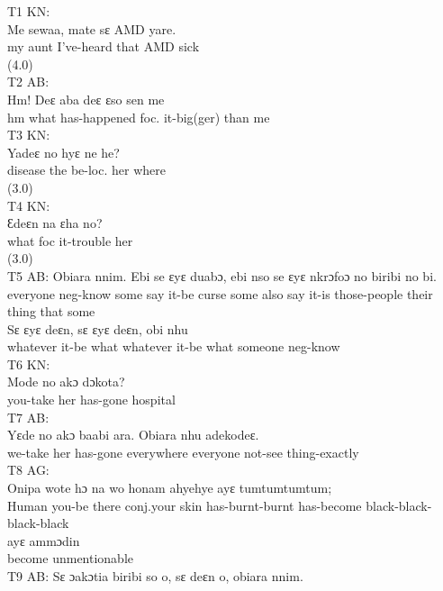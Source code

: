 \documentclass[output=paper,colorlinks,citecolor=brown]{langscibook}
\begin{document}
\ea%
    T1 KN:\\
    \gll    Me sewaa, mate sɛ AMD yare.\\
            my aunt I’ve-heard that AMD sick \\
            (4.0)\\
\ex%
    T2 AB:\\
    \gll    Hm! Deɛ aba deɛ ɛso sen me\\
            hm what has-happened foc. it-big(ger) than me\\
\ex%
    T3 KN:\\
    \gll    Yadeɛ no hyɛ ne he?\\
            disease the be-loc. her where\\
            (3.0) \\
\ex%
    T4 KN:\\
    \gll    Ɛdeɛn na ɛha no?\\
            what foc it-trouble her\\
            (3.0)\\
\ex%
    T5 AB:
    \ea
    \gll    Obiara nnim. Ebi se ɛyɛ duabɔ, ebi nso se ɛyɛ nkrɔfoɔ no biribi no bi.\\ 
            everyone neg-know some say it-be curse some also say it-is those-people their thing that some\\
    \ex
    \gll    Sɛ ɛyɛ deɛn, sɛ ɛyɛ deɛn, obi nhu \\
            whatever it-be what whatever it-be what someone neg-know\\
    \z
\ex%
    T6 KN:\\
    \gll    Mode no akɔ dɔkota?\\
            you-take her has-gone hospital \\
\ex%
    T7 AB:\\
    \gll    Yɛde no akɔ baabi ara. Obiara nhu adekodeɛ.\\
            we-take her has-gone everywhere everyone not-see thing-exactly\\
\ex%
    T8 AG:\\
    \ea
    \gll    Onipa wote hɔ na wo honam ahyehye ayɛ tumtumtumtum; \\
            Human you-be there conj.your skin has-burnt-burnt has-become black-black-black-black \\
    \ex
    \gll    ayɛ ammɔdin \\
            become unmentionable \\
    \z
\ex%
    T9 AB:
    \ea
    \gll    Sɛ ɔakɔtia biribi so o, sɛ deɛn o, obiara nnim. \\
\end{document}
